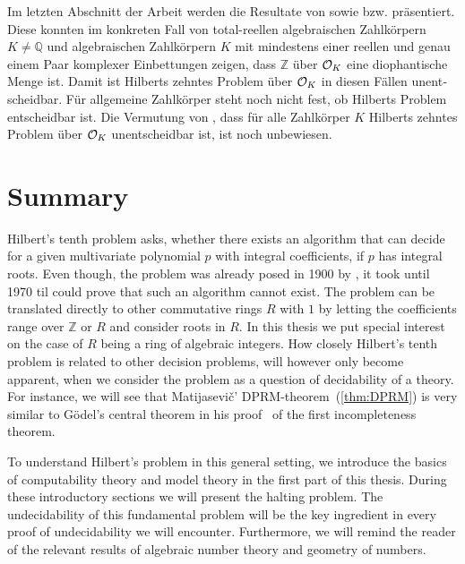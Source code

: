 \begin{german}
Im letzten Abschnitt der Arbeit werden die Resultate von \textcite{Denef1980}
sowie \textcite{Pheidas1988} bzw. \textcite{Shlapentokh1989} präsentiert. Diese
konnten im konkreten Fall von total-reellen algebraischen Zahlkörpern \(K ≠ ℚ\)
und algebraischen Zahlkörpern \(K\) mit mindestens einer reellen und genau einem
Paar komplexer Einbettungen zeigen, dass \(ℤ\) über \(\mathcal{O}_{K}\) eine
diophantische Menge ist. Damit ist Hilberts zehntes Problem über \(\mathcal{O}_{K}\) in
diesen Fällen unentscheidbar. Für allgemeine Zahlkörper steht noch nicht fest,
ob Hilberts Problem entscheidbar ist. Die Vermutung von \textcite{Denef1978},
dass für alle Zahlkörper \(K\) Hilberts zehntes Problem über \(\mathcal{O}_{K}\)
unentscheidbar ist, ist noch unbewiesen.
\end{german}
\clearpage

\section{Summary}

Hilbert's tenth problem asks, whether there exists an algorithm that can decide
for a given multivariate polynomial \(p\) with integral coefficients, if \(p\)
has integral roots. Even though, the problem was already posed in 1900 by
\textcite{Hilbert1900}, it took until 1970 til \textcite{Matijasevic1970} could
prove that such an algorithm cannot exist. The problem can be translated
directly to other commutative rings \(R\) with \(1\) by letting the coefficients
range over \(ℤ\) or \(R\) and consider roots in \(R\). In this thesis we put
special interest on the case of \(R\) being a ring of algebraic integers. How
closely Hilbert's tenth problem is related to other decision problems, will
however only become apparent, when we consider the problem as a question of
decidability of a theory. For instance, we will see that Matijasevič'
\textsc{DPRM}-theorem~(\ref{thm:DPRM}) is very similar to Gödel's central
theorem in his proof~\cite{Goedel1931} of the first incompleteness theorem.

To understand Hilbert's problem in this general setting, we introduce the basics
of computability theory and model theory in the first part of this thesis.
During these introductory sections we will present the halting problem. The
undecidability of this fundamental problem will be the key ingredient in every
proof of undecidability we will encounter. Furthermore, we will remind the
reader of the relevant results of algebraic number theory and geometry of
numbers.

